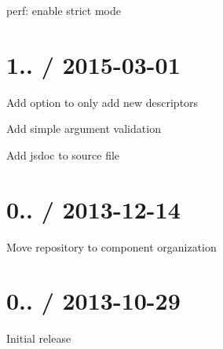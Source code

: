 
\begin{DoxyItemize}
\item perf\+: enable strict mode
\end{DoxyItemize}

\section*{1.. / 2015-\/03-\/01 }


\begin{DoxyItemize}
\item Add option to only add new descriptors
\item Add simple argument validation
\item Add jsdoc to source file
\end{DoxyItemize}

\section*{0.. / 2013-\/12-\/14 }


\begin{DoxyItemize}
\item Move repository to {\ttfamily component} organization
\end{DoxyItemize}

\section*{0.. / 2013-\/10-\/29 }


\begin{DoxyItemize}
\item Initial release 
\end{DoxyItemize}